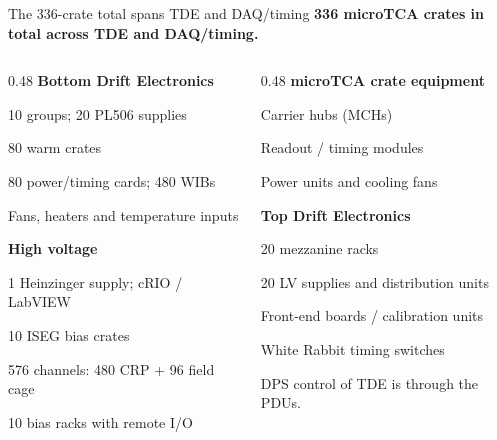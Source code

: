 \begin{frame}{The 336-crate total spans TDE and DAQ/timing}
\textbf{336 microTCA crates in total across TDE and DAQ/timing.}\par\bigskip
\small
\begin{columns}[T,onlytextwidth]
\begin{column}{0.48\textwidth}
\textbf{Bottom Drift Electronics}\par
\hspace*{0.8em}10 groups; 20 PL506 supplies\par
\hspace*{0.8em}80 warm crates\par
\hspace*{1.6em}80 power/timing cards; 480 WIBs\par
\hspace*{1.6em}Fans, heaters and temperature inputs\par\bigskip
\textbf{High voltage}\par
\hspace*{0.8em}1 Heinzinger supply; cRIO / LabVIEW\par
\hspace*{0.8em}10 ISEG bias crates\par
\hspace*{1.6em}576 channels: 480 CRP + 96 field cage\par
\hspace*{0.8em}10 bias racks with remote I/O
\end{column}
\begin{column}{0.48\textwidth}
\textbf{microTCA crate equipment}\par
\hspace*{0.8em}Carrier hubs (MCHs)\par
\hspace*{0.8em}Readout / timing modules\par
\hspace*{0.8em}Power units and cooling fans\par\bigskip
\textbf{Top Drift Electronics}\par
\hspace*{0.8em}20 mezzanine racks\par
\hspace*{0.8em}20 LV supplies and distribution units\par
\hspace*{0.8em}Front-end boards / calibration units\par
\hspace*{0.8em}White Rabbit timing switches\par\medskip
DPS control of TDE is through the PDUs.
\end{column}
\end{columns}
\end{frame}

